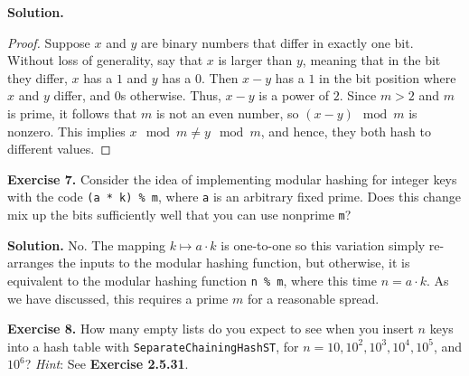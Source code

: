 \documentclass[12pt, a4paper]{article}
\newenvironment{ex}[2][Exercise]
{\par\medskip\noindent \textbf{#1 #2.}}
{\medskip}
\newenvironment{sol}[1][Solution]
{\par\medskip\noindent \textbf{#1.} }
{\medskip}
\begin{document}
	\begin{sol}
		\begin{proof}
			Suppose $x$ and $y$ are binary numbers that differ in exactly one bit.
			Without loss of generality, say that $x$ is larger than $y$, meaning that
			in the bit they differ, $x$ has a $1$ and $y$ has a $0$. Then $x-y$ has
			a $1$ in the bit position where $x$ and $y$ differ, and $0$s otherwise.
			Thus, $x-y$ is a power of $2$. Since $m>2$ and $m$ is prime, it follows
			that $m$ is not an even number, so $(x-y)\mod m$ is nonzero. This implies
			$x\mod m \neq y\mod m$, and hence, they both hash to different values.
		\end{proof}
	\end{sol}
	\begin{ex}{7}
		Consider the idea of implementing modular hashing for integer keys with the code
		\texttt{(a * k) \% m}, where \texttt{a} is an arbitrary fixed prime. Does this change
		mix up the bits sufficiently well that you can use nonprime \texttt{m}?
	\end{ex}
	\begin{sol}
		No. The mapping $k\mapsto a\cdot k$ is one-to-one so this variation simply re-arranges
		the inputs to the modular hashing function, but otherwise, it is equivalent to
		the modular hashing function \texttt{n \% m}, where this time $n=a\cdot k$. As
		we have discussed, this requires a prime $m$ for a reasonable spread.
	\end{sol}
	\begin{ex}{8}
		How many empty lists do you expect to see when you insert $n$ keys into a hash table
		with \texttt{SeparateChainingHashST}, for $n=10, 10^2, 10^3, 10^4, 10^5$, and $10^6$?
		\emph{Hint}: See \textbf{Exercise 2.5.31}.
	\end{ex}
\end{document}
